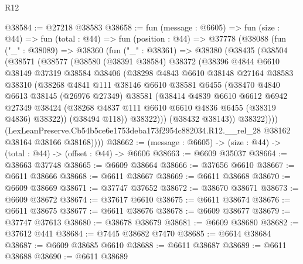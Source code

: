 \begin{lexlean}{R12}
\begin{coremodule}
@38584 := @27218 @38583
@38658 := fun (message : @6605) =>
  fun (size : @44) =>
  fun (total : @44) =>
  fun (position : @44) =>
  @37778
    (@38088
      (fun ("_" : @38089) =>
      @38360
        (fun ("_" : @38361) =>
        @38380
          (@38435
            (@38504
              (@38571
                (@38577
                  (@38580
                    (@38391 @38584)
                    @38372
                    (@38396
                      @4844
                      @6610
                      @38149
                      @37319
                      @38584
                      @38406
                      (@38298
                        @4843
                        @6610
                        @38148
                        @27164
                        @38583
                        @38310
                        (@38268
                          @4841
                          @111
                          @38146
                          @6610
                          @38581
                          @6455
                          (@38470
                            @4840
                            @6613
                            @38145
                            (@26976 @27349)
                            @38581
                            (@38414
                              @4839
                              @6610
                              @6612
                              @6942
                              @27349
                              @38424
                              (@38268 @4837 @111 @6610 @6610 @4836 @6455 (@38319 @4836) @38322))
                            (@38494 @118))
                          @38322)))
                    (@38432 @38143))
                  @38322))))
          (LexLeanPreserve.Cb54b5ce6e1753deba173f2954c882034.R12.__rel_28
            @38162
            @38164
            @38166
            @38168))))
@38662 := (message : @6605) -> (size : @44) -> (total : @44) -> (offset : @44) -> @6606
@38663 := @6609 @35037
@38664 := @38663 @37748
@38665 := @6609 @38664
@38666 := @37656 @6610
@38667 := @6611 @38666
@38668 := @6611 @38667
@38669 := @6611 @38668
@38670 := @6609 @38669
@38671 := @37747 @37652
@38672 := @38670 @38671
@38673 := @6609 @38672
@38674 := @37617 @6610
@38675 := @6611 @38674
@38676 := @6611 @38675
@38677 := @6611 @38676
@38678 := @6609 @38677
@38679 := @37747 @37613
@38680 := @38678 @38679
@38681 := @6609 @38680
@38682 := @37612 @441
@38684 := @7445 @38682 @7470
@38685 := @6614 @38684
@38687 := @6609 @38685 @6610
@38688 := @6611 @38687
@38689 := @6611 @38688
@38690 := @6611 @38689

\end{coremodule}
\end{lexlean}
